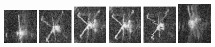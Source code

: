 \begin{figure}
    \includegraphics[width=0.15\textwidth]{chapters/images/dataset/all-class-images/valve/valve-1.jpg}
    \includegraphics[width=0.15\textwidth]{chapters/images/dataset/all-class-images/valve/valve-199.jpg}
    \includegraphics[width=0.15\textwidth]{chapters/images/dataset/all-class-images/valve/valve-77.jpg}
    \includegraphics[width=0.15\textwidth]{chapters/images/dataset/all-class-images/valve/valve-66.jpg}
    \includegraphics[width=0.15\textwidth]{chapters/images/dataset/all-class-images/valve/valve-105.jpg}
    \includegraphics[width=0.15\textwidth]{chapters/images/dataset/all-class-images/valve/valve-15.jpg}
    

\end{figure}
